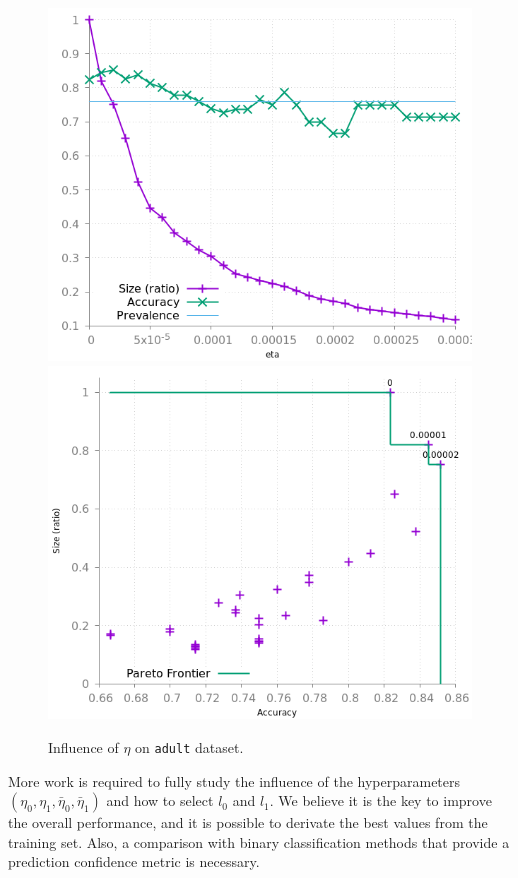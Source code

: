 \documentclass[sigconf,edbt]{acmart-edbt-workshops}
\begin{document}
\begin{figure}[!h]\centering
\includegraphics[scale=0.35]{img/meta_adult.png}
\hfill
\includegraphics[scale=0.35]{img/meta_pareto_adult.png}
\caption{Influence of $\eta$ on \texttt{adult} dataset.}
\label{fig:meta_adult}
\end{figure}
More work is required to fully study the influence of the hyperparameters $(\eta_0, \eta_1, \bar \eta_0, \bar \eta_1)$ and how to select $l_0$ and $l_1$. We believe it is the key to improve the overall performance, and it is possible to derivate the best values from the training set. Also, a comparison with binary classification methods that provide a prediction confidence metric is necessary.
\end{document}
